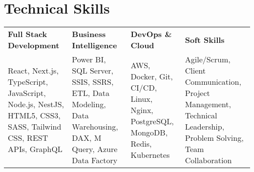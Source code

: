 \section{\textbf{Technical Skills}}
\begin{tabular}{p{}p{}p{}p{}}
\textbf{Full Stack Development} & \textbf{Business Intelligence} & \textbf{DevOps \& Cloud} & \textbf{Soft Skills} \\
React, Next.js, TypeScript, JavaScript, Node.js, NestJS, HTML5, CSS3, SASS, Tailwind CSS, REST APIs, GraphQL & Power BI, SQL Server, SSIS, SSRS, ETL, Data Modeling, Data Warehousing, DAX, M Query, Azure Data Factory & AWS, Docker, Git, CI/CD, Linux, Nginx, PostgreSQL, MongoDB, Redis, Kubernetes & Agile/Scrum, Client Communication, Project Management, Technical Leadership, Problem Solving, Team Collaboration \\
\end{tabular}
\vspace{\skillsEndSpacing}